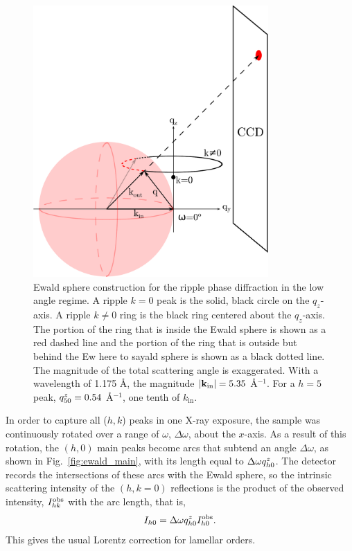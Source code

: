 \begin{figure}[htbp]
  \centering
  \includegraphics[width=0.8\textwidth]{figures/ripple/analysis/ripple_sample_qspace}
  \caption{Ewald sphere construction for the ripple phase diffraction in
  the low angle regime. A ripple $k=0$ peak is the solid, black circle
  on the $q_z$-axis.
  A ripple $k\neq 0$ ring is the black ring centered about the $q_z$-axis. 
  The portion of the ring that is 
  inside the Ewald sphere is shown as a red dashed line and the portion of the 
  ring that is outside but behind the Ew here to sayald sphere is shown as a black
  dotted line. The magnitude of the total scattering angle is exaggerated. 
  With a wavelength
  of 1.175 \AA, the magnitude $|\mathbf{k}_{\mathrm{in}}|=5.35$ \AA$^{-1}$. For a $h=5$ peak,
  $q_{50}^z=0.54$ \AA$^{-1}$, one tenth of $k_\textrm{in}$.}
  \label{fig:ripple_sample_qspace}
\end{figure}

In order to capture all ($h,k$) peaks in one X-ray exposure, 
the sample was continuously rotated over a range of $\omega$, $\Delta\omega$,
about the $x$-axis. As a result of this rotation, 
the $(h,0)$ main peaks become arcs that subtend an angle $\Delta\omega$,
as shown in Fig.~\ref{fig:ewald_main}, with its length
equal to $\Delta\omega q_{h0}^z$. 
The detector records the intersections of these arcs with the 
Ewald sphere, so the intrinsic scattering intensity of the $(h,k=0)$ reflections
is the product of the observed intensity, $I_{hk}^\textrm{obs}$ with the arc length, that is, 
\begin{equation}
  I_{h0} = \Delta\omega q_{h0}^z I_{h0}^\textrm{obs}. \label{eq:main_ewald}
\end{equation}
This gives the usual Lorentz correction for lamellar orders.

